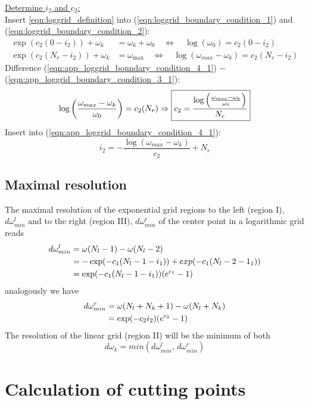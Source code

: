\newpage
\vspace{1cm}
\noindent\underline{Determine $i_2$ and $c_2$:}\\

\noindent Insert \ref{eqn:loggrid_definition} into (\ref{eqn:loggrid_boundary_condition_1}) and (\ref{eqn:loggrid_boundary_condition_2}):
\begin{align}
	\exp(c_2(0-i_2))+\omega_k&=\omega_k+\omega_0 \quad \Leftrightarrow \quad \log(\omega_0)=c_2 (0-i_2) \label{eqn:app_loggrid_boundary_condition_3_1}\\
	\exp(c_2(N_r-i_2))+\omega_k&=\omega_{\max} \quad \Leftrightarrow \quad \log(\omega_{max}-\omega_k)=c_2(N_r-i_2) \label{eqn:app_loggrid_boundary_condition_4_1}
\end{align}
Difference (\ref{eqn:app_loggrid_boundary_condition_4_1}) $-$ (\ref{eqn:app_loggrid_boundary_condition_3_1}):
\[
	\log\left(\frac{\omega_{max}-\omega_k}{\omega_0}\right)=c_2 (N_r)\\\Rightarrow \boxed{c_2=\frac{\log\left(\frac{\omega_{max}-\omega_k}{\omega_0}\right)}{N_r}}
\]
Insert into (\ref{eqn:app_loggrid_boundary_condition_4_1}):
\[
	\boxed{i_2=-\frac{\log(\omega_{max}-\omega_k)}{c_2} + N_r}
\]
\section{Maximal resolution}
\label{sec:app_loggrid_max_resolution}
The maximal resolution of the exponential grid regions to the left (region I), $d\omega_{min}^{l}$ and to the right (region III), $d\omega_{min}^{r}$ of the center point in a logarithmic grid reads
\begin{align*}
	d\omega_{min}^{l} & = \omega(N_l-1)-\omega(N_l-2) \notag \\
	& = -\exp(-c_1(N_l-1-i_1))+exp(-c_1(N_l-2-1_1)) \notag \\
	& = \exp(-c_1(N_l-1-i_1))(e^{c_1}-1)
\end{align*}
analogously we have
\begin{align*}
	d\omega_{min}^{r} & = \omega(N_l+N_k+1)-\omega(N_l+N_k) \notag \\
	& = \exp(-c_2 i_2)(e^{c_2}-1)
\end{align*}
The resolution of the linear grid (region II) will be the minimum of both
\[
	d\omega_k = min( d\omega_{min}^{l} ,\,d\omega_{min}^{r})
\]
\chapter{Calculation of cutting points}\label{chapter:app_cutting_points}







